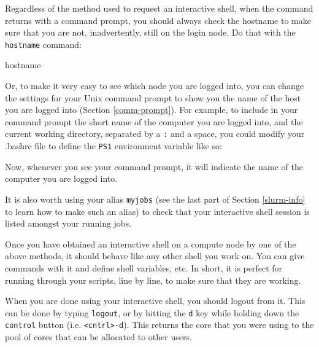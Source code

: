 \documentclass[]{krantz}
\makeatletter
\newenvironment{Shaded}{\begin{snugshade}}{\end{snugshade}}
\newcommand{\FunctionTok}[1]{\textcolor[rgb]{0,0,0}{#1}}
\newcommand{\StringTok}[1]{\textcolor[rgb]{0.5,0.5,0.5}{#1}}
\newcommand{\VariableTok}[1]{\textcolor[rgb]{0,0,0}{#1}}
\newenvironment{kframe}{%
\medskip{}
\setlength{\fboxsep}{.8em}
 \def\at@end@of@kframe{}%
 \ifinner\ifhmode%
  \def\at@end@of@kframe{\end{minipage}}%
  \begin{minipage}{\columnwidth}%
 \fi\fi%
 \def\FrameCommand##1{\hskip\@totalleftmargin \hskip-\fboxsep
 \colorbox{shadecolor}{##1}\hskip-\fboxsep
     \hskip-\linewidth \hskip-\@totalleftmargin \hskip\columnwidth}%
 \MakeFramed {\advance\hsize-\width
   \@totalleftmargin\z@ \linewidth\hsize
   \@setminipage}}%
 {\par\unskip\endMakeFramed%
 \at@end@of@kframe}
\renewenvironment{Shaded}{\begin{kframe}}{\end{kframe}}
\makeatother
\begin{document}
Regardless of the method used to request an interactive shell, when the command
returns with a command prompt, you should always check the hostname to make sure
that you are not, inadvertently, still on the login node. Do that with the \texttt{hostname}
command:

\begin{Shaded}
\begin{Highlighting}[]
\FunctionTok{hostname}
\end{Highlighting}
\end{Shaded}

Or, to make it very easy to see which node you are logged into, you can change
the settings for your Unix command prompt to show you the name of the host you
are logged into (Section \ref{comm-prompt}). For example, to include in your
command prompt the short name of the computer you are logged into, and the current
working directory, separated by a \texttt{:} and a space, you could modify your .bashrc
file to define the \texttt{PS1} environment
variable like so:

\begin{Shaded}
\end{Shaded}

Now, whenever you see your command prompt, it will indicate the name of the computer
you are logged into.

It is also worth using your alias \texttt{myjobs} (see the last part of Section \ref{slurm-info}
to learn how to make such an alias) to check that your interactive shell session is listed amongst
your running jobs.

Once you have obtained an interactive shell on a compute node by one of the above
methods, it should behave like any other shell you work on. You can give commands
with it and define shell variables, etc. In short, it is perfect for running through your
scripts, line by line, to make sure that they are working.

When you are done using your interactive shell, you should logout from it. This can be
done by typing \texttt{logout}, or by hitting the \texttt{d} key while holding down the \texttt{control} button
(i.e. \texttt{\textless{}cntrl\textgreater{}-d}). This returns the core that you were using to the pool of cores that can
be allocated to other users.
\end{document}

